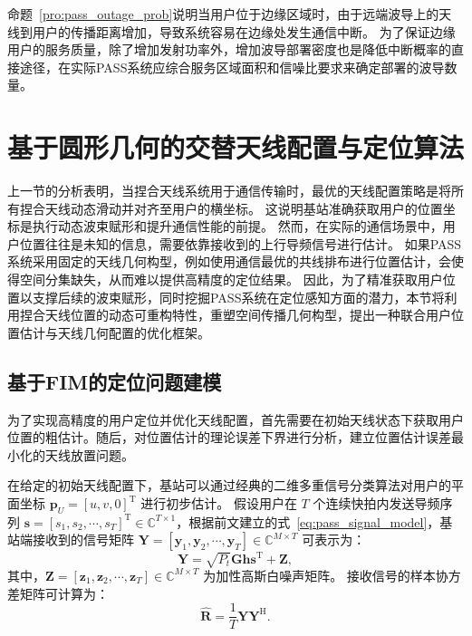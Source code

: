 命题~\ref{pro:pass_outage_prob}说明当用户位于边缘区域时，由于远端波导上的天线到用户的传播距离增加，导致系统容易在边缘处发生通信中断。
为了保证边缘用户的服务质量，除了增加发射功率外，增加波导部署密度也是降低中断概率的直接途径，在实际PASS系统应综合服务区域面积和信噪比要求来确定部署的波导数量。

\section{基于圆形几何的交替天线配置与定位算法}\label{sec:pass_CG-APPL}

上一节的分析表明，当捏合天线系统用于通信传输时，最优的天线配置策略是将所有捏合天线动态滑动并对齐至用户的横坐标。
这说明基站准确获取用户的位置坐标是执行动态波束赋形和提升通信性能的前提。
然而，在实际的通信场景中，用户位置往往是未知的信息，需要依靠接收到的上行导频信号进行估计。
如果PASS系统采用固定的天线几何构型，例如使用通信最优的共线排布进行位置估计，会使得空间分集缺失，从而难以提供高精度的定位结果。
因此，为了精准获取用户位置以支撑后续的波束赋形，同时挖掘PASS系统在定位感知方面的潜力，本节将利用捏合天线位置的动态可重构特性，重塑空间传播几何构型，提出一种联合用户位置估计与天线几何配置的优化框架。

\subsection{基于FIM的定位问题建模}

为了实现高精度的用户定位并优化天线配置，首先需要在初始天线状态下获取用户位置的粗估计。随后，对位置估计的理论误差下界进行分析，建立位置估计误差最小化的天线放置问题。

在给定的初始天线配置下，基站可以通过经典的二维多重信号分类算法对用户的平面坐标 $\bm{p}_U = [u, v, 0]^{\mathrm{T}}$ 进行初步估计\cite{schmidt1986multiple}。
假设用户在 $T$ 个连续快拍内发送导频序列 $\bm{s} = [s_1, s_2, \cdots, s_T]^{\mathrm{T}} \in \mathbb{C}^{T \times 1}$，根据前文建立的式~\eqref{eq:pass_signal_model}，基站端接收到的信号矩阵 $\bm{Y} = [\bm{y}_1, \bm{y}_2, \cdots, \bm{y}_T] \in \mathbb{C}^{M \times T}$ 可表示为：
\begin{equation}\label{eq:pass_music_Y}
	\bm{Y} = \sqrt{P_t} \bm{G} \bm{h} \bm{s}^{\mathrm{T}} + \bm{Z},
\end{equation}
其中，$\bm{Z} = [\bm{z}_1, \bm{z}_2, \cdots, \bm{z}_T] \in \mathbb{C}^{M \times T}$ 为加性高斯白噪声矩阵。
接收信号的样本协方差矩阵可计算为：
\begin{equation}\label{eq:pass_music_R}
	\hat{\bm{R}} = \frac{1}{T} \bm{Y} \bm{Y}^{\mathrm{H}}.
\end{equation}

